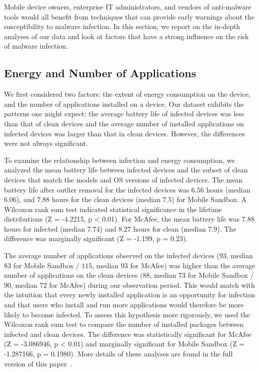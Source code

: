 Mobile device owners, enterprise IT administrators, and vendors of
anti-malware tools would all benefit from techniques that can provide
early warnings about the susceptibility to malware infection. In this
section, we report on the in-depth analyses of our data and look at factors
that have a strong influence on the risk of malware infection.


\ifwww
\subsection{Energy and Number of Applications}
We first considered two factors: the extent of energy consumption on the
device, and the number of applications installed on a device.
Our dataset exhibits the patterns one might expect: the average
battery life of infected devices was less than that of clean devices
and the average number of installed applications on infected devices
was larger than that in clean devices.  However, the differences were
not always significant.  

To examine the relationship between infection and energy consumption,
we analyzed the mean battery life between infected devices and the
subset of clean devices that match the models and OS versions of
infected devices.  The mean battery life after outlier removal for the
infected devices was $6.56$ hours (median $6.06$), and $7.88$ hours
for the clean devices (median $7.5$) for Mobile Sandbox. A Wilcoxon
rank sum test indicated statistical significance in the lifetime
distributions (Z = -4.2215, p < 0.01).  For McAfee, the mean battery
life was $7.88$ hours for infected (median $7.74$) and $8.27$ hours
for clean (median $7.9$). The difference was marginally significant (Z
= -1.199, p = 0.23).

The average number of applications observed on the infected devices
($93$, median $83$ for Mobile Sandbox / $115$, median $93$ for McAfee)
was higher than the average number of applications on the clean
devices $(88$, median $73$ for Mobile Sandbox / $90$, median $72$ for
McAfee) during our observation period. This would match with the
intuition that every newly installed application is an opportunity for
infection and that users who install and run more applications would
therefore be more likely to become infected. To assess this hypothesis
more rigorously, we used the Wilcoxon rank sum test to compare the
number of installed packages between infected and clean devices. The
difference was statistically significant for McAfee (Z = -3.086946, p
< 0.01) and marginally significant for Mobile Sandbox (Z = -1.287166,
p = 0.1980). More details of these analyses are found in the full
version of this paper~\cite{TruongMobileMalware2013}.




